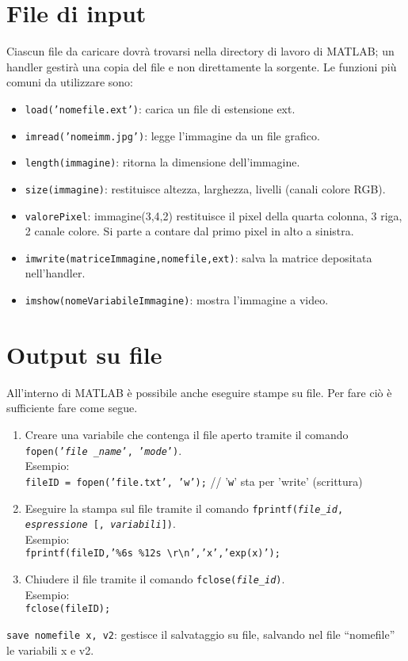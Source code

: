 \section{File di input}
Ciascun file da caricare dovrà trovarsi nella directory di lavoro di MATLAB; un handler gestirà una copia del file e 
non direttamente la sorgente. Le funzioni più comuni da utilizzare sono:

\begin{itemize}
    \item	\texttt{load('nomefile.ext')}: carica un file di estensione ext.
    \item	\texttt{imread('nomeimm.jpg')}: legge l'immagine da un file grafico.
    \item	\texttt{length(immagine)}: ritorna la dimensione dell'immagine.
    \item	\texttt{size(immagine)}: restituisce altezza, larghezza, livelli (canali colore RGB).
    \item	\texttt{valorePixel}: immagine(3,4,2) restituisce il pixel della quarta colonna, 3 riga, 2 canale colore. 
    Si parte a contare dal primo pixel in alto a sinistra. 
    \item	\texttt{imwrite(matriceImmagine,nomefile,ext)}: salva la matrice depositata nell'handler.
    \item	\texttt{imshow(nomeVariabileImmagine)}: mostra l'immagine a video.
\end{itemize}

\section{Output su file}
All'interno di MATLAB è possibile anche eseguire stampe su file. Per fare ciò è sufficiente fare come segue.
\begin{enumerate}
	\item	Creare una variabile che contenga il file aperto tramite il comando \texttt{fopen('\textit{file
			\_name}', '\textit{mode}')}. \\
			Esempio: \\ \texttt{fileID = fopen('file.txt', 'w');} // '\texttt{w}' sta per 'write' (scrittura)
			
	\item 	Eseguire la stampa sul file tramite il comando \texttt{fprintf(\textit{file\_id}, \textit{espressione} [, 	
	\textit{variabili}])}. \\
			Esempio: \\ \texttt{fprintf(fileID,'\%6s \%12s \textbackslash r\textbackslash n','x','exp(x)');}
			
	\item 	Chiudere il file tramite il comando \texttt{fclose(\textit{file\_id})}. \\
			Esempio: \\ \texttt{fclose(fileID);}
\end{enumerate}

\texttt{save nomefile x, v2}: gestisce il salvataggio su file, salvando nel file ``nomefile'' le variabili x e v2.